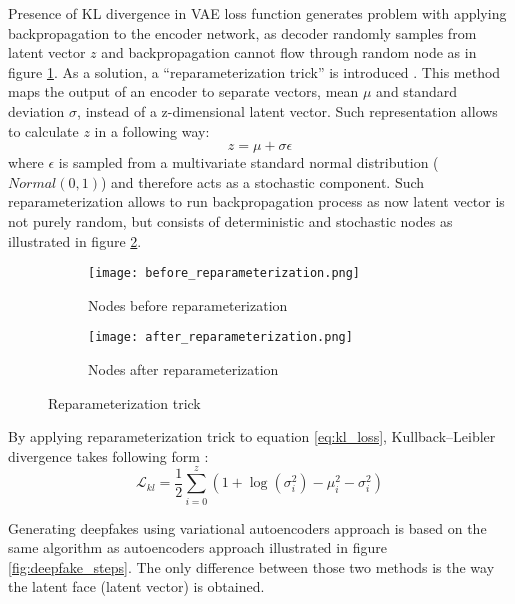 Presence of KL divergence in VAE loss function generates problem with applying backpropagation to the encoder network, as decoder randomly samples from latent vector \(z\) and backpropagation cannot flow through random node as in figure \ref{subfig:before_reparameterization}. As a solution, a ``reparameterization trick'' is introduced \cite{reparameterization_trick_bib}. This method maps the output of an encoder to separate vectors, mean \(\mu\) and standard deviation \(\sigma\), instead of a z-dimensional latent vector. Such representation allows to calculate \(z\) in a following way:
%
\begin{equation}
\label{eq:rec_loss}
z = \mu + \sigma\epsilon
\end{equation}
%
where \(\epsilon\) is sampled from a multivariate standard normal distribution (\(Normal(0,1)\)) and therefore acts as a stochastic component. Such reparameterization allows to run backpropagation process as now latent vector is not purely random, but consists of deterministic and stochastic nodes as illustrated in figure \ref{subfig:after_reparameterization}.

\begin{figure}[H]
\centering
\begin{subfigure}{.5\textwidth}
  \centering
  \texttt{[image: before\_reparameterization.png]}
  \caption{Nodes before reparameterization}
  \label{subfig:before_reparameterization}
\end{subfigure}%
\begin{subfigure}{.5\textwidth}
  \centering
  \texttt{[image: after\_reparameterization.png]}
  \caption{Nodes after reparameterization}
  \label{subfig:after_reparameterization}
\end{subfigure}
\caption{Reparameterization trick}
\label{fig:reparameterization_trick}
\end{figure}

By applying reparameterization trick to equation \ref{eq:kl_loss}, Kullback–Leibler divergence takes following form \cite{kl_divergence_loss_bib}:
%
\begin{equation}
\label{eq:final_kl_loss}
\mathcal{L}_{kl} = \frac{1}{2}\sum_{i=0}^{z}(1 + \log(\sigma_i^2) - \mu_i^2 -\sigma_i^2)
\end{equation}

Generating deepfakes using variational autoencoders approach is based on the same algorithm as autoencoders approach illustrated in figure \ref{fig:deepfake_steps}. The only difference between those two methods is the way the latent face (latent vector) is obtained.

